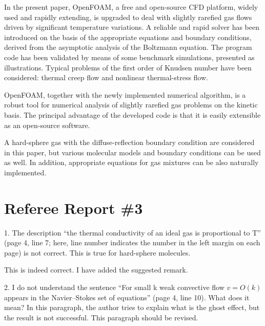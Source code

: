 \documentclass{article}
\begin{document}
\begin{leftbar}
In the present paper, OpenFOAM\textregistered{}, a free and open-source CFD platform,
widely used and rapidly extending, is upgraded to deal with
slightly rarefied gas flows driven by significant temperature variations.
A reliable and rapid solver has been introduced on the basis of the appropriate
equations and boundary conditions, derived from the asymptotic analysis of the Boltzmann equation.
The program code has been validated by means of some benchmark simulations,
presented as illustrations. Typical problems of the first order of Knudsen number
have been considered: thermal creep flow and nonlinear thermal-stress flow.

OpenFOAM\textregistered{}, together with the newly implemented numerical algorithm,
is a robust tool for numerical analysis of slightly rarefied gas problems
on the kinetic basis. The principal advantage of the developed code is that
it is easily extensible as an open-source software.

A hard-sphere gas with the diffuse-reflection boundary condition are considered in this paper,
but various molecular models and boundary conditions can be used as well.
In addition, appropriate equations for gas mixtures can be also naturally implemented.
\end{leftbar}

\section{Referee Report \#3}

\begin{quoting}
1. The description ``the thermal conductivity of an ideal gas is
proportional to T'' (page 4, line 7; here, line number indicates the
number in the left margin on each page) is not correct. This is true for
hard-sphere molecules.
\end{quoting}

This is indeed correct. I have added the suggested remark.

\begin{quoting}
2. I do not understand the sentence ``For small k weak convective flow \(v
= O(k)\) appears in the Navier--Stokes set of equations'' (page 4, line 10).
What does it mean? In this paragraph, the author tries to explain what
is the ghost effect, but the result is not successful. This paragraph
should be revised.
\end{quoting}
\end{document}
